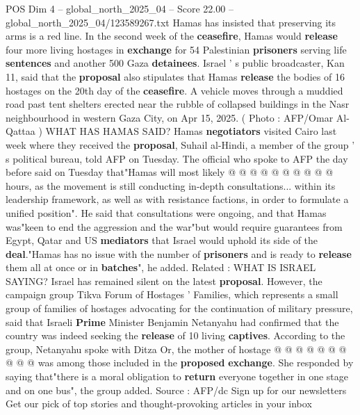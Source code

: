 \begin{textsample}{POS Dim 4 – global\_north\_2025\_04 – Score 22.00 – global\_north\_2025\_04/123589267.txt}
Hamas has insisted that preserving its arms is a red line.
In the second week of the \textbf{ceasefire}, Hamas would \textbf{release} four more living hostages in \textbf{exchange} for 54 Palestinian \textbf{prisoners} serving life \textbf{sentences} and another 500 Gaza \textbf{detainees}.
Israel ' s public broadcaster, Kan 11, said that the \textbf{proposal} also stipulates that Hamas \textbf{release} the bodies of 16 hostages on the 20th day of the \textbf{ceasefire}.
A vehicle moves through a muddied road past tent shelters erected near the rubble of collapsed buildings in the Nasr neighbourhood in western Gaza City, on Apr 15, 2025. ( Photo : AFP/Omar Al-Qattaa ) WHAT HAS HAMAS SAID?
Hamas \textbf{negotiators} visited Cairo last week where they received the \textbf{proposal}, Suhail al-Hindi, a member of the group ' s political bureau, told AFP on Tuesday.
The official who spoke to AFP the day before said on Tuesday that"Hamas will most likely @ @ @ @ @ @ @ @ @ @ hours, as the movement is still conducting in-depth consultations... within its leadership framework, as well as with resistance factions, in order to formulate a unified position".
He said that consultations were ongoing, and that Hamas was"keen to end the aggression and the war"but would require guarantees from Egypt, Qatar and US \textbf{mediators} that Israel would uphold its side of the \textbf{deal}."Hamas has no issue with the number of \textbf{prisoners} and is ready to \textbf{release} them all at once or in \textbf{batches}", he added.
Related : WHAT IS ISRAEL SAYING?
Israel has remained silent on the latest \textbf{proposal}.
However, the campaign group Tikva Forum of Hostages ' Families, which represents a small group of families of hostages advocating for the continuation of military pressure, said that Israeli \textbf{Prime} Minister Benjamin Netanyahu had confirmed that the country was indeed seeking the \textbf{release} of 10 living \textbf{captives}.
According to the group, Netanyahu spoke with Ditza Or, the mother of hostage @ @ @ @ @ @ @ @ @ @ was among those included in the \textbf{proposed} \textbf{exchange}.
She responded by saying that"there is a moral obligation to \textbf{return} everyone together in one stage and on one bus", the group added.
Source : AFP/dc Sign up for our newsletters Get our pick of top stories and thought-provoking articles in your inbox

\end{textsample}
